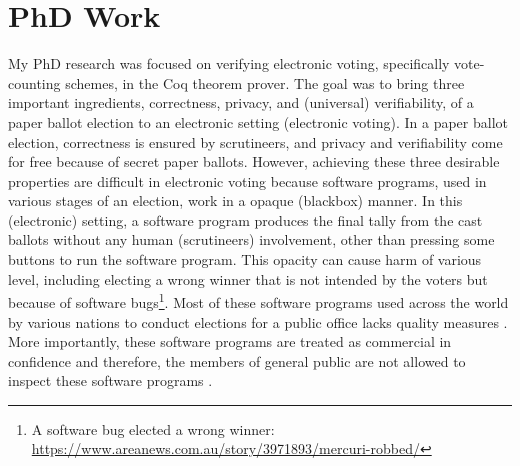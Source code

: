 \documentclass[a4paper]{article}
\begin{document}
\section{PhD Work}
My PhD research was focused on verifying electronic voting, specifically vote-counting schemes, in 
the Coq theorem prover. The goal was to 
bring  three important ingredients, correctness, privacy, and (universal) verifiability, of a paper ballot election to 
an electronic setting (electronic voting). In a paper ballot election, correctness is
ensured by scrutineers, and privacy and verifiability  
come for free because of secret paper ballots.  However, achieving these three desirable properties 
are difficult in 
electronic voting because software programs, used in 
various stages of an election, work in a opaque (blackbox) manner. In this (electronic) setting, 
a software program produces the final tally from the cast ballots without any human (scrutineers) involvement, 
other than pressing some 
buttons to run the software program. This opacity can cause harm of various level, including electing a 
wrong winner that is not intended by the voters but because 
of software bugs\footnote{A software bug elected a wrong winner: \url{https://www.areanews.com.au/story/3971893/mercuri-robbed/}}. Most of 
these software programs used across the world by various nations to conduct elections for a public office 
lacks quality measures \cite{10.1145/3014812.3014837, 9152765}. More importantly, these software programs are 
treated as commercial in confidence and therefore,
the members of general public are not allowed to inspect these software programs \cite{AEC:2013:LMM}.
\end{document}
